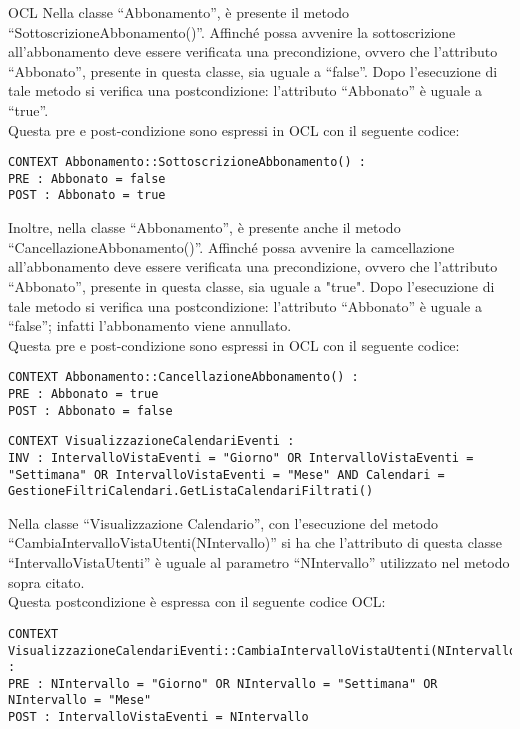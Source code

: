 \begin{listaPersonale}{OCL}
    Nella classe “Abbonamento”, è presente il metodo “SottoscrizioneAbbonamento()”. Affinché possa avvenire la sottoscrizione all'abbonamento deve essere verificata una precondizione, ovvero che l'attributo “Abbonato”, presente in questa classe, sia uguale a “false”. Dopo l'esecuzione di tale metodo si verifica una postcondizione: l'attributo “Abbonato” è uguale a “true”.\\
    Questa pre e post-condizione sono espressi in OCL con il seguente codice:
    \begin{lstlisting}
CONTEXT Abbonamento::SottoscrizioneAbbonamento() :
PRE : Abbonato = false
POST : Abbonato = true
    \end{lstlisting}
    Inoltre, nella classe “Abbonamento”, è presente anche il metodo “CancellazioneAbbonamento()”. Affinché possa avvenire la camcellazione all'abbonamento deve essere verificata una precondizione, ovvero che l'attributo “Abbonato”, presente in questa classe, sia uguale a "true". Dopo l'esecuzione di tale metodo si verifica una postcondizione: l'attributo “Abbonato” è uguale a “false”; infatti l'abbonamento viene annullato.\\
    Questa pre e post-condizione sono espressi in OCL con il seguente codice:
    \begin{lstlisting}
CONTEXT Abbonamento::CancellazioneAbbonamento() :
PRE : Abbonato = true
POST : Abbonato = false
    \end{lstlisting}




    \begin{lstlisting}
CONTEXT VisualizzazioneCalendariEventi :
INV : IntervalloVistaEventi = "Giorno" OR IntervalloVistaEventi = "Settimana" OR IntervalloVistaEventi = "Mese" AND Calendari = GestioneFiltriCalendari.GetListaCalendariFiltrati()
    \end{lstlisting}
    Nella classe “Visualizzazione Calendario”, con l'esecuzione del metodo “CambiaIntervalloVistaUtenti(NIntervallo)” si ha che l'attributo di questa classe “IntervalloVistaUtenti” è uguale al parametro “NIntervallo” utilizzato nel metodo sopra citato. \\
    Questa postcondizione è espressa con il seguente codice OCL:
    \begin{lstlisting}
CONTEXT VisualizzazioneCalendariEventi::CambiaIntervalloVistaUtenti(NIntervallo) :
PRE : NIntervallo = "Giorno" OR NIntervallo = "Settimana" OR NIntervallo = "Mese"
POST : IntervalloVistaEventi = NIntervallo
    \end{lstlisting}





\end{listaPersonale}
